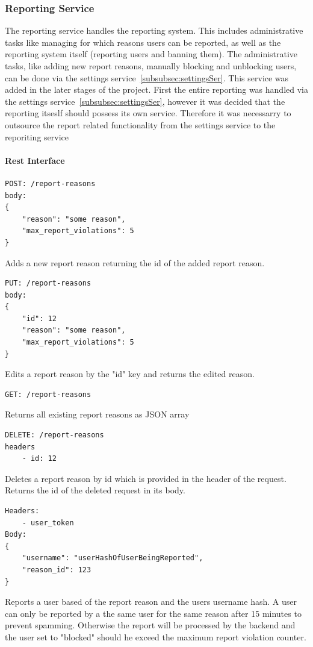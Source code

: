 \subsubsection{Reporting Service}
\label{subsubsec:reportingSer}
The reporting service handles the reporting system.
This includes administrative tasks like managing for which reasons users can be reported, as well as the reporting system itself (reporting users and banning them).
The administrative tasks, like adding new report reasons, manually blocking and unblocking users, can be done via the
settings service~\ref{subsubsec:settingsSer}.
This service was added in the later stages of the project.
First the entire reporting was handled via the settings service~\ref{subsubsec:settingsSer}, however it was decided that the reporting itseslf should possess its own service.
Therefore it was necessarry to outsource the report related functionality from the settings service to the reporiting service

\paragraph{Rest Interface}
\begin{verbatim}
POST: /report-reasons
body:
{
    "reason": "some reason",
    "max_report_violations": 5
}
\end{verbatim}
Adds a new report reason returning the id of the added report reason.

\begin{verbatim}
PUT: /report-reasons
body:
{
    "id": 12
    "reason": "some reason",
    "max_report_violations": 5
}
\end{verbatim}
Edits a report reason by the "id" key and returns the edited reason.

\begin{verbatim}
GET: /report-reasons
\end{verbatim}
Returns all existing report reasons as JSON array

\begin{verbatim}
DELETE: /report-reasons
headers
    - id: 12
\end{verbatim}
Deletes a report reason by id which is provided in the header of the request.
Returns the id of the deleted request in its body.

\begin{verbatim}
Headers:
    - user_token
Body:
{
    "username": "userHashOfUserBeingReported",
    "reason_id": 123
}
\end{verbatim}
Reports a user based of the report reason and the users username hash.
A user can only be reported by a the same user for the same reason after 15 minutes to prevent spamming.
Otherwise the report will be processed by the backend and the user set to "blocked" should he exceed the maximum report violation counter.
